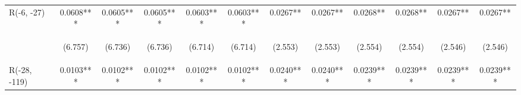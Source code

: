 \documentclass[]{article}
\begin{document}
\begin{center}
\begin{tabular}{lccccccccccc}
R(-6, -27) & 0.0608*** & 0.0605*** & 0.0605*** & 0.0603*** & 0.0603*** & 0.0267** & 0.0267** & 0.0268** & 0.0268** & 0.0267** & 0.0267** \\
\vspace{4pt} & \begin{footnotesize}(6.757)\end{footnotesize} & \begin{footnotesize}(6.736)\end{footnotesize} & \begin{footnotesize}(6.736)\end{footnotesize} & \begin{footnotesize}(6.714)\end{footnotesize} & \begin{footnotesize}(6.714)\end{footnotesize} & \begin{footnotesize}(2.553)\end{footnotesize} & \begin{footnotesize}(2.553)\end{footnotesize} & \begin{footnotesize}(2.554)\end{footnotesize} & \begin{footnotesize}(2.554)\end{footnotesize} & \begin{footnotesize}(2.546)\end{footnotesize} & \begin{footnotesize}(2.546)\end{footnotesize} \\
R(-28, -119) & 0.0103*** & 0.0102*** & 0.0102*** & 0.0102*** & 0.0102*** & 0.0240*** & 0.0240*** & 0.0239*** & 0.0239*** & 0.0239*** & 0.0239*** \\

\end{tabular}
\end{center}
\end{document}
